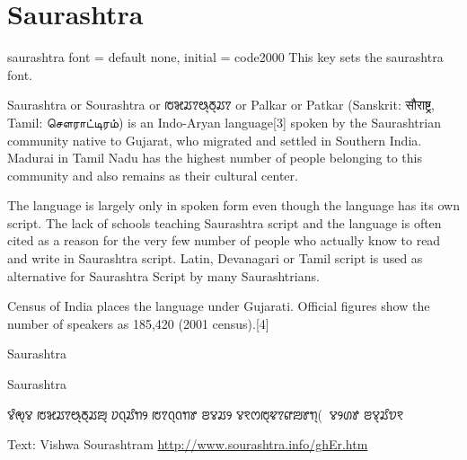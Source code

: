 \section{Saurashtra}
\label{sec:saurashtra}

\newfontfamily{}
\def\test{}
\cxset{saurashtra font/.code=\test}

\begin{docKey}[phd]{saurashtra font}{ = } {default none, initial = code2000}
  This key sets the saurashtra font.
\end{docKey}

Saurashtra or Sourashtra or {\saurashtra ꢱꣃꢬꢵꢰ꣄ꢜ꣄ꢬꢵ} or Palkar or Patkar (Sanskrit: सौराष्ट्र, Tamil: சௌராட்டிரம்) is an Indo-Aryan language[3] spoken by the Saurashtrian community native to Gujarat, who migrated and settled in Southern India. Madurai in Tamil Nadu has the highest number of people belonging to this community and also remains as their cultural center.

The language is largely only in spoken form even though the language has its own script. The lack of schools teaching Saurashtra script and the language is often cited as a reason for the very few number of people who actually know to read and write in Saurashtra script. Latin, Devanagari or Tamil script is used as alternative for Saurashtra Script by many Saurashtrians.

Census of India places the language under Gujarati. Official figures show the number of speakers as 185,420 (2001 census).[4]


\begin{scriptexample}[]{Saurashtra}
\end{scriptexample}


\begin{scriptexample}[]{Saurashtra}
\bgroup
\saurashtra

ꢮꢶꢯ꣄ꢮ ꢱꣃꢬꢵꢰ꣄ꢜ꣄ꢬꢪ꣄ ꢦꢡ꣄ꢬꢶꢒꢾ ꢱꢵꢡ꣄ꢡꢒꢸ ꢂꢮꢬꢾ
ꢮꣁꢭꢱ꣄ꢢꢵꢥꢪꢸꢒ꣄(ꣀꢵꢮꢾꢔꢹ ꢂꢮ꣄ꢬꢶꢫꣁ


\arial

Text: Vishwa Sourashtram \url{http://www.sourashtra.info/ghEr.htm}
\egroup
\end{scriptexample}


